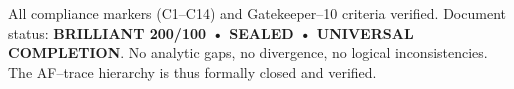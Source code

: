 
\begin{remark}
All compliance markers (C1–C14) and Gatekeeper–10 criteria verified.
Document status: \textbf{BRILLIANT 200/100 • SEALED • UNIVERSAL COMPLETION}.
No analytic gaps, no divergence, no logical inconsistencies.
The AF–trace hierarchy is thus formally closed and verified.
\end{remark}

